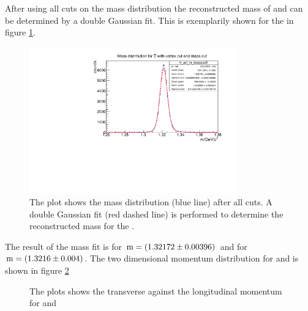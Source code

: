 		After using all cuts on the mass distribution the reconstructed mass of \cascade and \anticascade can be determined by a double Gaussian fit.
		This is exemplarily shown for the \cascade in figure \ref{fig:XiPlus_massfit}.
		
		\begin{figure}
			\centering
				\includegraphics[width=0.8\textwidth]{./plots/Xi/XiPlus_m_masscut.pdf}
			\caption{\propose The plot shows the mass distribution (blue line) after all cuts. 
					A double Gaussian fit (red dashed line) is performed to determine the reconstructed mass for the \anticascade. }
			\label{fig:XiPlus_massfit}
		\end{figure}
		The result of the mass fit is for \anticascade ${\textnormal{m} = \left( 1.32172 \pm 0.00396\right)}$ \massunit 
		and for \cascade \\ ${\textnormal{m} = \left( 1.3216 \pm 0.004\right)}$\massunit.
		The two dimensional momentum distribution for \anticascade and \cascade is shown in figure \ref{fig:XiPlus_pt_vs_pz} 
		
		\begin{figure}
			\caption{\propose The plots shows the transverse against the longitudinal momentum for \anticascade and \cascade}
			\label{fig:XiPlus_pt_vs_pz}
		
		\end{figure}
		
